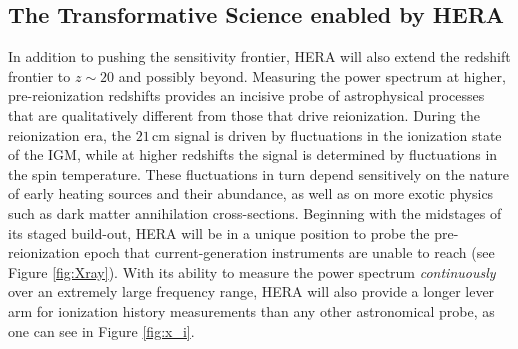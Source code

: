 \documentclass[preprint]{aastex}
\begin{document}
\subsection{The Transformative Science enabled by HERA}


In addition to pushing the sensitivity frontier, HERA will also extend the redshift frontier 
to $z \sim 20$ and possibly beyond.  Measuring the power spectrum at higher, pre-reionization redshifts provides
an incisive probe of astrophysical processes that are qualitatively different from those that
drive reionization.  During the reionization era, the $21\,\textrm{cm}$ signal is driven by
fluctuations in the ionization state of the IGM, while at higher redshifts the signal is determined
by fluctuations in the spin temperature.  These fluctuations in turn depend sensitively on the nature of early heating sources  and their abundance, as well as on more exotic physics such as dark matter annihilation cross-sections.  Beginning with the midstages of its staged build-out, HERA will be in a unique position to probe the pre-reionization epoch that current-generation instruments are unable to reach (see Figure \ref{fig:Xray}).  With its ability to measure the power spectrum \emph{continuously} over an extremely large frequency range,
HERA will also provide a longer lever arm for ionization history measurements than any other astronomical probe,
as one can see in Figure \ref{fig:x_i}.
\end{document}
